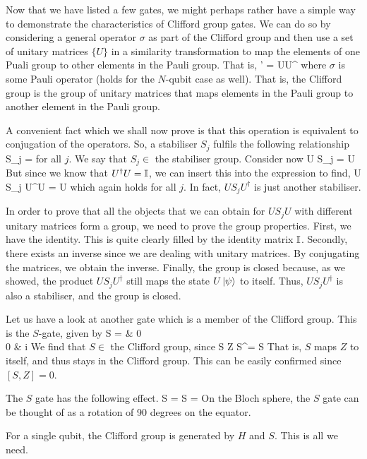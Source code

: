 Now that we have listed a few gates, we might perhaps rather have a simple way to demonstrate the characteristics of Clifford group gates. We can do so by considering a general operator $\sigma$ as part of the Clifford group and then use a set of unitary matrices $\{U\}$ in a similarity transformation to map the elements of one Puali group to other elements in the Pauli group. That is, 
\beq
\sigma \rightarrow \sigma' = U\sigma U^\dagger
\eeq
where $\sigma$ is some Pauli operator (holds for the $N$-qubit case as well). That is, the Clifford group is the group of unitary matrices that maps elements in the Pauli group to another element in the Pauli group. 


A convenient fact which we shall now prove is that this operation is equivalent to conjugation of the operators. So, a stabiliser $S_j$ fulfils the following relationship
\beq
S_j \ket{\psi} = \ket{\psi}
\eeq
for all $j$. We say that $S_j \in $ the stabiliser group. Consider now 
\beq
U S_j \ket{\psi} = U \ket{\psi}
\eeq
But since we know that $U^\dagger U = \mathbb{I}$, we can insert this into the expression to find, 
\beq
U S_j U^\dagger U \ket{\psi} = U \ket{\psi}
\eeq
which again holds for all $j$. In fact, $US_j U^\dagger$ is just another stabiliser. 

In order to prove that all the objects that we can obtain for $US_jU$ with different unitary matrices form a group, we need to prove the group properties. First, we have the identity. This is quite clearly filled by the identity matrix $\mathbb{I}$. Secondly, there exists an inverse since we are dealing with unitary matrices. By conjugating the matrices, we obtain the inverse. Finally, the group is closed because, as we showed, the product $U S_j U^\dagger$ still maps the state $U \ket{\psi}$ to itself. Thus, $US_j U^\dagger$ is also a stabiliser, and the group is closed. 

Let us have a look at another gate which is a member of the Clifford group. This is the $S$-gate, given by 
\beq
S =  & 0 \\ 0 & i \epmat
\eeq
We find that $S \in$ the Clifford group, since 
\beq
S Z S^\dagger = S
\eeq
That is, $S$ maps $Z$ to itself, and thus stays in the Clifford group. This can be easily confirmed since $[S, Z]= 0$. 

The $S$ gate has the following effect. 
\beq
S \ket{+} = 
\eeq
\beq
S  = \ket{-}
\eeq
On the Bloch sphere, the $S$ gate can be thought of as a rotation of 90 degrees on the equator. 

For a single qubit, the Clifford group is generated by $H$ and $S$. This is all we need. 

